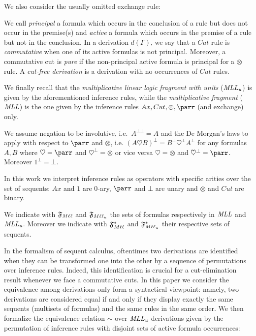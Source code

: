 \documentclass[a4paper]{article}
\begin{document}
We also consider the usually omitted exchange rule: 
\begin{prooftree}
\end{prooftree}

We call \emph{principal} a formula which occurs in the conclusion of a rule but does not occur in the premise(s) and \emph{active} a formula which occurs in the premise of a rule but not in the conclusion. In a derivation $d(\Gamma)$, we say that a $Cut$ rule is \emph{commutative} when one of its active formulas is not principal. Moreover, a commutative cut is \emph{pure} if the non-principal active formula is principal for a $\otimes$ rule.
A \emph{cut-free derivation} is a derivation with no occurrences of $Cut$ rules.

We finally recall that the \emph{multiplicative linear logic fragment with units} ($\MLLc$) is given by the aforementioned inference rules, while the \emph{multiplicative fragment} ($\MLL$) is the one given by the inference rules $Ax, Cut, \otimes , \parr$ (and exchange) only.




\begin{oss}[On Negation]\label{remNeg}
We assume negation to be involutive, i.e.~$A^{\bot \bot}=A$ and the De Morgan's laws to apply with respect to $\parr$ and $\otimes$, i.e. $(A \heartsuit B)^\bot= B^\bot \heartsuit^\bot A^\bot$ for any formulas $A,B$ where $\heartsuit=\parr$ and $\heartsuit^\bot=\otimes$ or vice versa $\heartsuit= \otimes $ and $\heartsuit^\bot= \parr$. Moreover $1^\bot=\bot$.
\end{oss}

\begin{oss}[On Rules]\label{arity}
In this work we interpret inference rules as operators with specific arities over the set of sequents: $Ax$ and $1$ are $0$-ary, $\parr$ and $\bot$ are unary and $\otimes$ and $Cut$ are binary.
\end{oss}

\nota We indicate with $\fmll$ and $\fmllc$ the sets of formulas respectively in $\MLL$ and $\MLLc$. Moreover we indicate with $\smll$ and $\smllc$ their respective sets of sequents.


In the formalism of sequent calculus, oftentimes two derivations are identified when they can be transformed one into the other by a sequence of permutations over inference rules. Indeed, this identification is crucial for a cut-elimination result whenever we face a commutative cuts.
In this paper we consider the equivalence among derivations only form a syntactical viewpoint: namely, two derivations are considered equal if and only if they display exactly the same sequents (multisets of formulas) and the same rules in the same order. We then formalize the equivalence relation $\sim$ over $\MLLc$ derivations given by the permutation of inference rules with disjoint sets of active formula occurrences:
\end{document}
